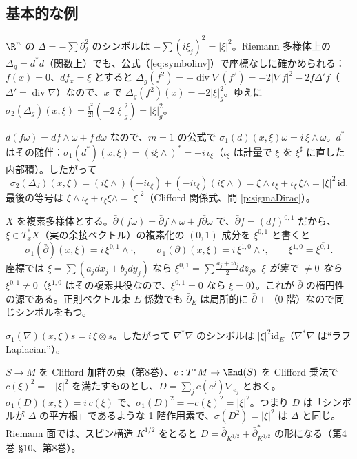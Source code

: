 \subsection{基本的な例}
\begin{ex}[Laplacian]\label{ex:lap}
$\R^n$ の $\Delta=-\sum\partial_j^2$ のシンボルは $-\sum(i\xi_j)^2=|\xi|^2$。Riemann 多様体上の $\Delta_g=d^*d$（関数上）でも、公式（\ref{eq:symbolinv}）で座標なしに確かめられる：$f(x)=0$、$df_x=\xi$ とすると $\Delta_g(f^2)=-\operatorname{div}\nabla(f^2)=-2|\nabla f|^2-2f\Delta'f$（$\Delta'=\operatorname{div}\nabla$）なので、$x$ で $\Delta_g(f^2)(x)=-2|\xi|_g^2$。ゆえに $\sigma_2(\Delta_g)(x,\xi)=\frac{i^2}{2!}(-2|\xi|_g^2)=|\xi|_g^2$。
\end{ex}
\begin{ex}[$d$、$d^*$、$\Delta_d$]\label{ex:dsym}
$d(f\omega)=df\wedge\omega+f\,d\omega$ なので、$m=1$ の公式で $\sigma_1(d)(x,\xi)\omega=i\,\xi\wedge\omega$。$d^*$ はその随伴：$\sigma_1(d^*)(x,\xi)=(i\xi\wedge)^*=-i\,\iota_\xi$（$\iota_\xi$ は計量で $\xi$ を $\xi^\sharp$ に直した内部積）。したがって
\[
\sigma_2(\Delta_d)(x,\xi)=(i\xi\wedge)(-i\iota_\xi)+(-i\iota_\xi)(i\xi\wedge)=\xi\wedge\iota_\xi+\iota_\xi\,\xi\wedge=|\xi|^2\,\mathrm{id}.
\]
最後の等号は $\xi\wedge\iota_\xi+\iota_\xi\xi\wedge=|\xi|^2$（Clifford 関係式、問 \ref{p:sigmaDirac}）。
\end{ex}
\begin{ex}\label{ex:dbarsym}
$X$ を複素多様体とする。$\bar\partial(f\omega)=\bar\partial f\wedge\omega+f\bar\partial\omega$ で、$\bar\partial f=(df)^{0,1}$ だから、$\xi\in T^*_xX$（実の余接ベクトル）の複素化の $(0,1)$ 成分を $\xi^{0,1}$ と書くと
\[
\sigma_1(\bar\partial)(x,\xi)=i\,\xi^{0,1}\wedge\cdot,\qquad\sigma_1(\partial)(x,\xi)=i\,\xi^{1,0}\wedge\cdot,\qquad\xi^{1,0}=\overline{\xi^{0,1}}.
\]
座標では $\xi=\sum(a_jdx_j+b_jdy_j)$ なら $\xi^{0,1}=\sum\frac{a_j+ib_j}2d\bar z_j$。\emph{$\xi$ が実で $\neq0$ なら $\xi^{0,1}\ne0$}（$\xi^{1,0}$ はその複素共役なので、$\xi^{0,1}=0$ なら $\xi=0$）。これが $\bar\partial$ の楕円性の源である。正則ベクトル束 $E$ 係数でも $\bar\partial_E$ は局所的に $\bar\partial+$（$0$ 階）なので同じシンボルをもつ。
\end{ex}
\begin{ex}[接続]\label{ex:nabla}
$\sigma_1(\nabla)(x,\xi)s=i\,\xi\otimes s$。したがって $\nabla^*\nabla$ のシンボルは $|\xi|^2\mathrm{id}_E$（$\nabla^*\nabla$ は``ラフ Laplacian''）。
\end{ex}
\begin{ex}\label{ex:dirac}
$S\to M$ を Clifford 加群の束（第8巻）、$c:T^*M\to\End(S)$ を Clifford 乗法で $c(\xi)^2=-|\xi|^2$ を満たすものとし、$D=\sum_jc(e^j)\nabla_{e_j}$ とおく。$\sigma_1(D)(x,\xi)=i\,c(\xi)$ で、$\sigma_1(D)^2=-c(\xi)^2=|\xi|^2$。つまり $D$ は「シンボルが $\Delta$ の平方根」であるような 1 階作用素で、$\sigma(D^2)=|\xi|^2$ は $\Delta$ と同じ。Riemann 面では、スピン構造 $K^{1/2}$ をとると $D=\bar\partial_{K^{1/2}}+\bar\partial_{K^{1/2}}^*$ の形になる（第4巻 \S10、第8巻）。
\end{ex}
